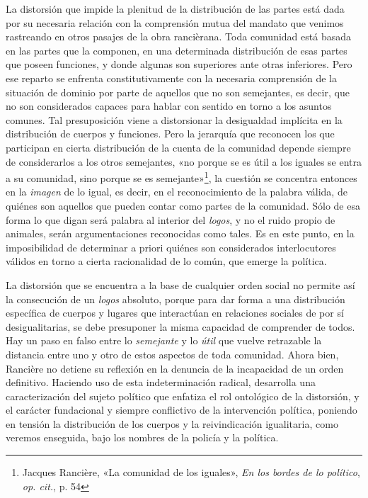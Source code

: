 La distorsión que impide la plenitud de la distribución de las partes está dada por su necesaria relación con la comprensión mutua del mandato que venimos rastreando en otros pasajes de la obra rancièrana. Toda comunidad está basada en las partes que la componen, en una determinada distribución de esas partes que poseen funciones, y donde algunas son superiores ante otras inferiores. Pero ese reparto se enfrenta constitutivamente con la necesaria comprensión de la situación de dominio por parte de aquellos que no son semejantes, es decir, que no son considerados capaces para hablar con sentido en torno a los asuntos comunes. Tal presuposición viene a distorsionar la desigualdad implícita en la distribución de cuerpos y funciones. Pero la jerarquía que reconocen los que participan en cierta distribución de la cuenta de la comunidad depende siempre de considerarlos a los otros semejantes, «no porque se es útil a los iguales se entra a su comunidad, sino porque se es semejante»\footnote{Jacques Rancière, «La comunidad de los iguales», \emph{En los bordes de lo político}, \emph{op. cit.}, p. 54}, la cuestión se concentra entonces en la \emph{imagen} de lo igual, es decir, en el reconocimiento de la palabra válida, de quiénes son aquellos que pueden contar como partes de la comunidad. Sólo de esa forma lo que digan será palabra al interior del \emph{logos}, y no el ruido propio de animales, serán argumentaciones reconocidas como tales. Es en este punto, en la imposibilidad de determinar a priori quiénes son considerados interlocutores válidos en torno a cierta racionalidad de lo común, que emerge la política.

La distorsión que se encuentra a la base de cualquier orden social no permite así la consecución de un \emph{logos} absoluto, porque para dar forma a una distribución específica de cuerpos y lugares que interactúan en relaciones sociales de por sí desigualitarias, se debe presuponer la misma capacidad de comprender de todos. Hay un paso en falso entre lo \emph{semejante} y lo \emph{útil} que vuelve retrazable la distancia entre uno y otro de estos aspectos de toda comunidad. Ahora bien, Rancière no detiene su reflexión en la denuncia de la incapacidad de un orden definitivo. Haciendo uso de esta indeterminación radical, desarrolla una caracterización del sujeto político que enfatiza el rol ontológico de la distorsión, y el carácter fundacional y siempre conflictivo de la intervención política, poniendo en tensión la distribución de los cuerpos y la reivindicación igualitaria, como veremos enseguida, bajo los nombres de la policía y la política.

